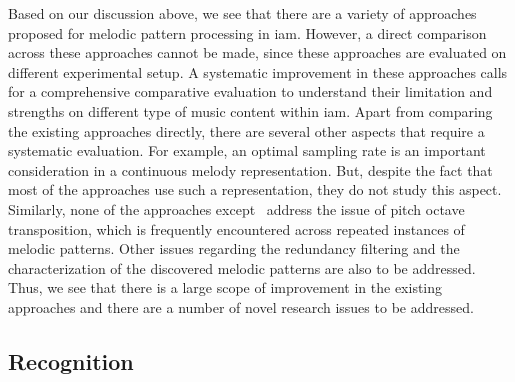 Based on our discussion above, we see that there are a variety of approaches proposed for melodic pattern processing in \gls{iam}. However, a direct comparison across these approaches cannot be made, since these approaches are evaluated on different experimental setup. A systematic improvement in these approaches calls for a comprehensive comparative evaluation to understand their limitation and strengths on different type of music content within \gls{iam}. Apart from comparing the existing approaches directly, there are several other aspects that require a systematic evaluation. For example, an optimal sampling rate is an important consideration in a continuous melody representation. But, despite the fact that most of the approaches use such a representation, they do not study this aspect. Similarly, none of the approaches except~\cite{Rao2014} address the issue of pitch octave transposition, which is frequently encountered across repeated instances of melodic patterns. Other issues regarding the redundancy filtering and the characterization of the discovered melodic patterns are also to be addressed. Thus, we see that there is a large scope of improvement in the existing approaches and there are a number of novel research issues to be addressed. 


\subsection{ Recognition}
\label{sec:sota_raga_recognition}




